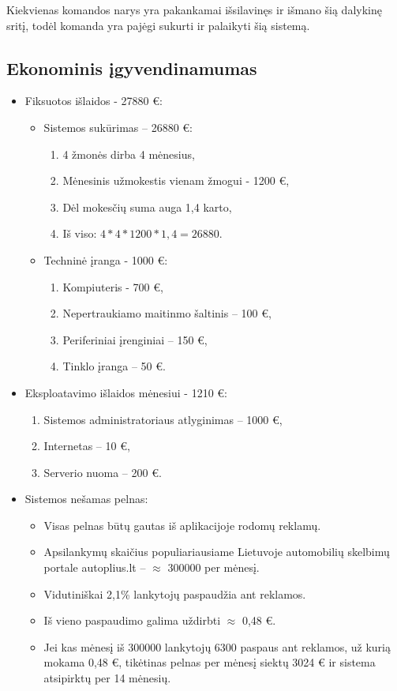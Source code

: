 \documentclass[12pt]{article}
\begin{document}
	Kiekvienas komandos narys yra pakankamai išsilavinęs ir išmano šią dalykinę sritį, todėl komanda yra pajėgi sukurti ir palaikyti šią sistemą.
	\pagebreak
	
	\subsection{Ekonominis įgyvendinamumas}
	
	\begin{itemize}
	\item{Fiksuotos išlaidos - 27880 €:}
	\begin{itemize}
	\item{Sistemos sukūrimas – 26880 €:}
	
	\begin{enumerate}
		\item{4 žmonės dirba 4 mėnesius,}
		\item{Mėnesinis užmokestis vienam žmogui - 1200 €,}
		\item{Dėl mokesčių suma auga 1,4 karto,}
		\item{Iš viso: $4*4*1200*1,4=26880$.}
	\end{enumerate}
	
	\item{Techninė įranga - 1000 €:}
	\begin{enumerate}
		\item{Kompiuteris - 700 €,}
		\item{Nepertraukiamo maitinmo šaltinis – 100 €,}
		\item{Periferiniai įrenginiai – 150 €,}
		\item{Tinklo įranga – 50 €.}
	\end{enumerate}
	\end{itemize}
	
	\item{Eksploatavimo išlaidos mėnesiui - 1210 €:}
	\begin{enumerate}
		\item{Sistemos administratoriaus atlyginimas – 1000 €,}
		\item{Internetas – 10 €,}
		\item{Serverio nuoma – 200 €.}
	\end{enumerate}
	
	\item{Sistemos nešamas pelnas:}
	\begin{itemize}
		\item{Visas pelnas būtų gautas iš aplikacijoje rodomų reklamų.}
		\item{Apsilankymų skaičius populiariausiame Lietuvoje automobilių skelbimų portale autoplius.lt – $\approx$ 300000 per mėnesį.}
		\item{Vidutiniškai 2,1\% lankytojų paspaudžia ant reklamos.}
		\item{Iš vieno paspaudimo galima uždirbti $\approx$ 0,48 €.}
		\item{Jei kas mėnesį iš 300000 lankytojų 6300 paspaus ant reklamos, už kurią mokama 0,48 €, tikėtinas pelnas per mėnesį siektų 3024 € ir sistema atsipirktų per 14 mėnesių.}
	\end{itemize}
	\end{itemize}
	
\end{document}
